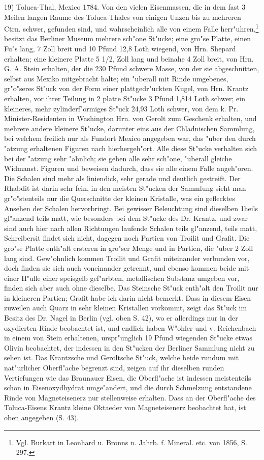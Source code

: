 \documentclass[a4paper, 11pt, oneside, german]{article}
\begin{document}
19) Toluca-Thal, Mexico 1784. Von den vielen Eisenmassen, die in dem fast 3 Meilen langen Raume des Toluca-Thales von einigen Unzen bis zu mehreren Ctrn. schwer, gefunden sind, und wahrscheinlich alle von einem Falle herr"uhren,\footnote{Vgl. Burkart in Leonhard u. Bronns n. Jahrb. f. Mineral. etc. von 1856, S. 297.} besitzt das Berliner Museum mehrere sch"one St"ucke; eine gro"se Platte, einen Fu"s lang, 7 Zoll breit und 10 Pfund 12,8 Loth wiegend, von Hrn. Shepard erhalten; eine kleinere Platte 5 1/2, Zoll lang und beinahe 4 Zoll breit, von Hrn. G. A. Stein erhalten, der die 230 Pfund schwere Masse, von der sie abgeschnitten, selbst aus Mexiko mitgebracht halte; ein "uberall mit Rinde umgebenes, gr"o"seres St"uck von der Form einer plattgedr"uckten Kugel, von Hrn. Krantz erhalten, vor ihrer Teilung in 2 platte St"ucke 3 Pfund 1,814 Loth schwer; ein kleineres, mehr zylinderf"ormiges St"uck 24,93 Loth schwer, von dem k. Pr. Minister-Residenten in Washington Hrn. von Gerolt zum Geschenk erhalten, und mehrere andere kleinere St"ucke, darunter eins aus der Chladnischen Sammlung, bei welchem freilich nur als Fundort Mexico angegeben war, das "uber den durch "atzung erhaltenen Figuren nach hierhergeh"ort. Alle diese St"ucke verhalten sich bei der "atzung sehr "ahnlich; sie geben alle sehr sch"one, "uberall gleiche Widmanst. Figuren und beweisen dadurch, dass sie alle einem Falle angeh"oren. Die Schalen sind mehr als liniendick, sehr gerade und deutlich gestreift. Der Rhabdit ist darin sehr fein, in den meisten St"ucken der Sammlung sieht man gr"o"stenteils nur die Querschnitte der kleinen Kristalle, was ein geflecktes Ansehen der Schalen hervorbringt. Bei gewisser Beleuchtung sind dieselben 1heils gl"anzend teils matt, wie besonders bei dem St"ucke des Dr. Krantz, und zwar sind auch hier nach allen Richtungen laufende Schalen teils gl"anzend, teils matt, Schreibersit findet sich nicht, dagegen noch Partien von Troilit und Grafit. Die gro"se Platte enth"alt ersteren in gro"ser Menge und in Partien, die "uber 2 Zoll lang sind. Gew"ohnlich kommen Troilit und Grafit miteinander verbunden vor, doch finden sie sich auch voneinander getrennt, und ebenso kommen beide mit einer H"ulle einer speisgelb gef"arbten, metallischen Substanz umgeben vor, finden sich aber auch ohne dieselbe. Das Steinsche St"uck enth"alt den Troilit nur in kleineren Partien; Grafit habe ich darin nicht bemerkt. Dass in diesem Eisen zuweilen auch Quarz in sehr kleinen Kristallen vorkommt, zeigt das St"uck im Besitz des Dr. Nagel in Berlin (vgl. oben S. 42), wo er allerdings nur in der oxydierten Rinde beobachtet ist, und endlich haben W"ohler und v. Reichenbach in einem von Stein erhaltenen, urspr"unglich 19 Pfund wiegenden St"ucke etwas Olivin beobachtet, der indessen in den St"ucken der Berliner Sammlung nicht zu sehen ist. Das Krantzsche und Geroltsche St"uck, welche beide rundum mit nat"urlicher Oberfl"ache begrenzt sind, zeigen auf ihr dieselben runden Vertiefungen wie das Braunauer Eisen, die Oberfl"ache ist indessen meistenteils schon in Eisenoxydhydrat umge"andert, und die durch Schmelzung entstandene Rinde von Magneteisenerz nur stellenweise erhalten. Dass an der Oberfl"ache des Toluca-Eisens Krantz kleine Oktaeder von Magneteisenerz beobachtet hat, ist oben angegeben (S. 43).
\end{document}
